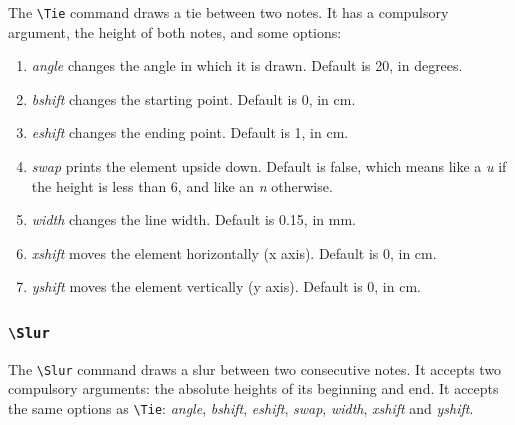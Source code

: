 \documentclass[final]{article}
\newcommand{\TTT}[2][0]{\Text[yshift=#1]{\texttt{\textbackslash #2}}}
\begin{document}
	The \verb|\Tie| command draws a tie between two notes. It has a compulsory argument, the height of both notes, and some options:
	
	\begin{enumerate}[-]
		\item \textsl{angle} changes the angle in which it is drawn. Default is 20, in degrees.
		\item \textsl{bshift} changes the starting point. Default is 0, in cm.
		\item \textsl{eshift} changes the ending point. Default is 1, in cm.
		\item \textsl{swap} prints the element upside down. Default is false, which means like a \textit{u} if the height is less than 6, and like an \textit{n} otherwise.
		\item \textsl{width} changes the line width. Default is 0.15, in mm.
		\item \textsl{xshift} moves the element horizontally (x axis). Default is 0, in cm.
		\item \textsl{yshift} moves the element vertically (y axis). Default is 0, in cm.
	\end{enumerate}
	
	\begin{center}
		\begin{mousik}
			\Clef
			\Space[0.5]
			\TTT{Tie[eshift=2]\{6\}}
			\Space[-0.5]
			\Barline
			\Space[0.5]
			\TTT{Tie[angle=45]\{4\}}
			\Space[-0.5]
			\Barline[t=|.]
		\end{mousik}
	\end{center}

	\subsubsection{\texttt{\textbackslash Slur}}
	The \verb|\Slur| command draws a slur between two consecutive notes. It accepts two compulsory arguments: the absolute heights of its beginning and end. It accepts the same options as \verb|\Tie|: \textsl{angle}, \textsl{bshift}, \textsl{eshift}, \textsl{swap}, \textsl{width}, \textsl{xshift} and \textsl{yshift}.
	
	\begin{center}
		\begin{mousik}
			\Clef
			\Space[0.5]
			\TTT{Slur\{4\}\{7\}}
			\Space[-0.5]
			\Note{4}{4}
			\Slur{4}{7}
			\Note{4}{7}
			\Barline[t=|.]
		\end{mousik}
	\end{center}
	
\end{document}
